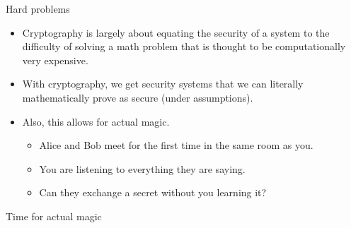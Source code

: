 \documentclass[aspectratio=169, lualatex, handout]{beamer}
\begin{document}
	\begin{frame}{Hard problems}
		\begin{itemize}
			\item Cryptography is largely about equating the security of a system to the
				difficulty of solving a math problem that is thought to be computationally
				very expensive. \pause

			\item With cryptography, we get security systems that we can literally
				mathematically prove as secure (under assumptions). \pause

			\item Also, this allows for actual magic.
				\begin{itemize}
					\pause

					\item Alice and Bob meet for the first time in the same room as you.
						\pause

					\item You are listening to everything they are saying. \pause

					\item Can they exchange a secret without you learning it?
				\end{itemize}
		\end{itemize}
	\end{frame}

	\begin{frame}{Time for actual magic}
	\end{frame}
\end{document}
